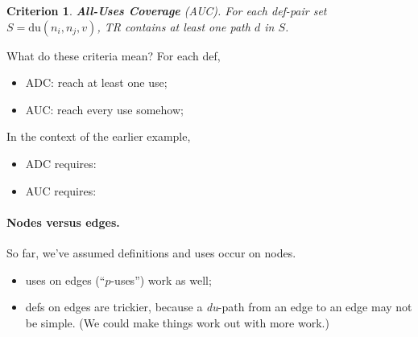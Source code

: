 \documentclass[11pt]{article}
\newtheorem{crit}{Criterion}
\begin{document}
\begin{crit}
{\bf All-Uses Coverage} (AUC). For each def-pair set $S = \mbox{du}(n_i, n_j,
v)$, TR contains at least one path $d$ in $S$.
\end{crit}


\newpage
What do these criteria mean? For each def,
\begin{itemize}
\item ADC: reach at least one use;
\item AUC: reach every use somehow;
\end{itemize}

{\sf In the context of the earlier example,}
\begin{itemize}
\item ADC requires:
\item AUC requires:
\end{itemize}

\paragraph{Nodes versus edges.}
So far, we've assumed definitions and uses occur on nodes.
\begin{itemize}
\item uses on edges (``$p$-uses'') work as well;
\item defs on edges are trickier, because a \emph{du}-path from an edge
to an edge may not be simple. (We could make things work out with more work.)
\end{itemize}
\end{document}
